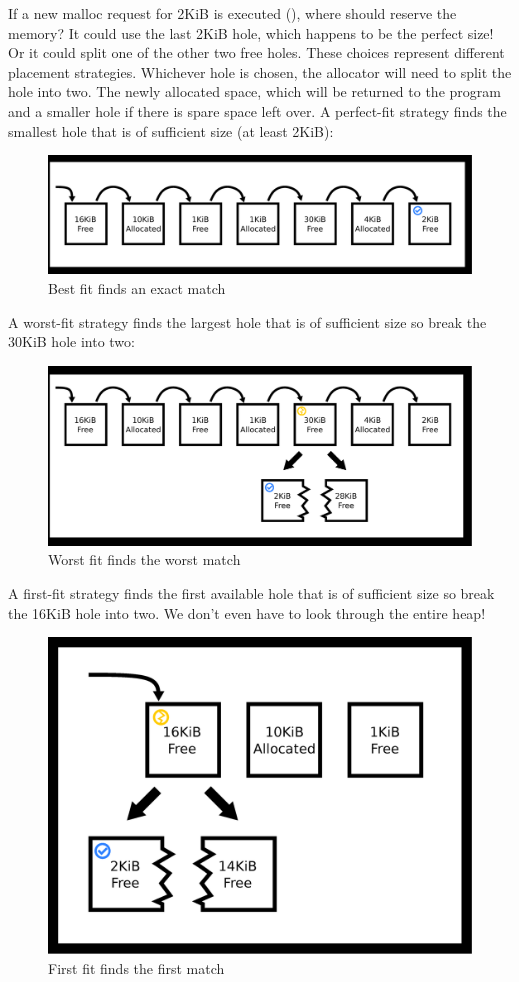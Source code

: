 If a new malloc request for 2KiB is executed (), where should  reserve the memory?
It could use the last 2KiB hole, which happens to be the perfect size!
Or it could split one of the other two free holes.
These choices represent different placement strategies.
Whichever hole is chosen, the allocator will need to split the hole into two.
The newly allocated space, which will be returned to the program and a smaller hole if there is spare space left over.
A perfect-fit strategy finds the smallest hole that is of sufficient size (at least 2KiB):

\begin{figure}[H]
\centering
\includegraphics[width=.9\textwidth]{malloc/drawings/heap_best_fit.eps}
\caption{Best fit finds an exact match}
\end{figure}

A worst-fit strategy finds the largest hole that is of sufficient size so break the 30KiB hole into two:

\begin{figure}[H]
\centering
\includegraphics[width=.9\textwidth]{malloc/drawings/heap_worst_fit.eps}
\caption{Worst fit finds the worst match}
\end{figure}


A first-fit strategy finds the first available hole that is of sufficient size so break the 16KiB hole into two.
We don't even have to look through the entire heap!

\begin{figure}[H]
\centering
\includegraphics[width=.5\textwidth]{malloc/drawings/heap_first_fit.eps}
\caption{First fit finds the first match}
\end{figure}

